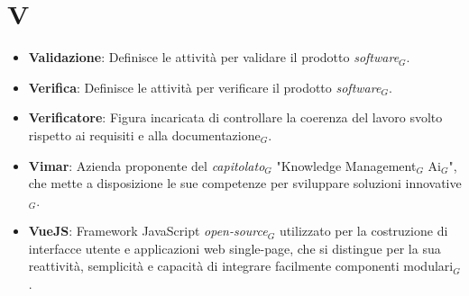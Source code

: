 \section{V}
\begin{itemize}
    \item \textbf{Validazione}: Definisce le attività per validare il prodotto \textit{software}$_G$.
    \item \textbf{Verifica}: Definisce le attività per verificare il prodotto \textit{software}$_G$.
    \item \textbf{Verificatore}: Figura incaricata di controllare la coerenza del lavoro svolto rispetto ai requisiti e alla documentazione$_G$.
    \item \textbf{Vimar}: Azienda proponente del \textit{capitolato}$_G$ "Knowledge Management$_G$ Ai$_G$", che mette a disposizione le sue competenze per sviluppare soluzioni innovative$_G$.
    \item \textbf{VueJS}: Framework JavaScript \textit{open-source}$_G$ utilizzato per la costruzione di interfacce utente e applicazioni web single-page, che si distingue per la sua reattività, semplicità e capacità di integrare facilmente componenti modulari$_G$.


\end{itemize}
